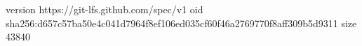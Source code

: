 version https://git-lfs.github.com/spec/v1
oid sha256:d657c57ba50e4c041d7964f8ef106ed035cf60f46a2769770f8aff309b5d9311
size 43840
